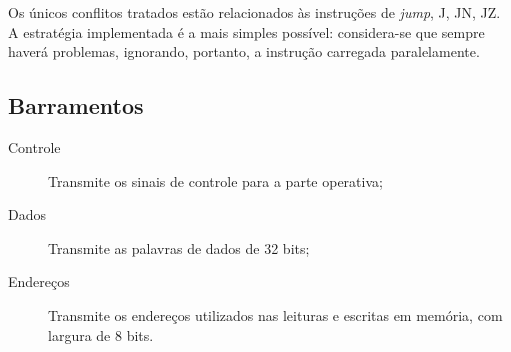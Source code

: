 \documentclass[a4paper]{article}
\begin{document}
Os únicos conflitos tratados estão relacionados às instruções de \emph{jump},
J, JN, JZ. A estratégia implementada é a mais simples possível: considera-se
que sempre haverá problemas, ignorando, portanto, a instrução carregada
paralelamente.

\subsection{Barramentos}
\begin{description}
	\item [Controle] Transmite os sinais de controle para
a parte operativa; 
	\item [Dados] Transmite as palavras de dados de 32 bits;
	\item [Endereços] Transmite os endereços utilizados nas
leituras e escritas em memória, com largura de 8 bits.
\end{description}
\end{document}
